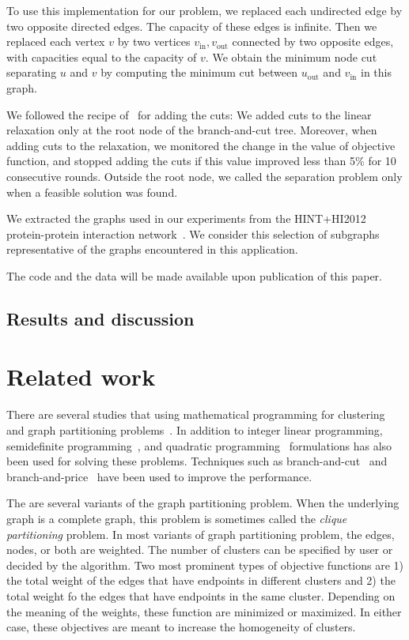 \documentclass[conference,compsoc]{IEEEtran}
\begin{document}
To use this implementation for our problem, we replaced
each undirected edge by two opposite directed edges. The capacity of
these edges is infinite. Then we replaced each vertex $v$ by two
vertices $v_{\text{in}}, v_{\text{out}}$ connected by two opposite
edges, with capacities equal to the capacity of $v$. We obtain the
minimum node cut separating $u$ and $v$ by computing the minimum cut
between $u_{\text{out}}$ and $v_{\text{in}}$ in this graph.

We followed the recipe of~\cite{CarvajalCGVW13} for adding the cuts: We added cuts to the
linear relaxation only at the root node of the branch-and-cut tree.
Moreover, when adding cuts to the relaxation, we monitored the change in
the value of objective function, and stopped adding the cuts if this
value improved less than 5\% for 10 consecutive rounds. Outside the root
node, we called the separation problem only when a feasible solution was
found.

We extracted the graphs used in our experiments from the HINT+HI2012 protein-protein interaction network~\cite{das2012hint,yu2011next}. We consider this selection of subgraphs representative of the graphs encountered in this application.



The code and the data will be made available upon publication of this paper.

\subsection{Results and discussion}

\section{Related work}
\label{sec:related}
There are several studies that using mathematical programming
for clustering and graph partitioning
problems~\cite{HansenJ97}. In addition to integer linear programming, semidefinite programming~\cite{ArmbrusterFHM08,LisserR03}, and quadratic programming~\cite{FanP10} formulations has also been used for solving these problems. Techniques such as branch-and-cut~\cite{FerreiraMSWW98,GrotschelW89} and branch-and-price~\cite{MehrotraT98,JiM07} have been used to improve the performance. 

The are several variants of the graph partitioning problem. When the underlying graph is a complete graph, this problem is sometimes called the \emph{clique partitioning} problem. In most variants of graph partitioning problem, the edges, nodes, or both are weighted. The number of clusters can be specified by user or decided by the algorithm. Two most prominent types of objective functions are 1) the total weight of the edges that have endpoints in different clusters and 2) the total weight fo the edges that have endpoints in the same cluster. Depending on the meaning of the weights, these function are minimized or maximized. In either case, these objectives are meant to increase the homogeneity of clusters.  
\end{document}
